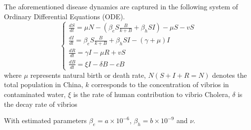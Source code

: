 \documentclass{book}
\begin{document}
The aforementioned disease dynamics are captured in the following system of Ordinary Differential Equations (ODE).
%
\begin{equation} \label{eq:cholera_model}
\left\{\begin{array}{l}
\frac{d S}{d t}=\mu N-\left(\beta_{e} S \frac{B}{k+B}+\beta_{h} S I\right)-\mu S-v S \\
\frac{d I}{d t}=\beta_{e} S \frac{B}{k+B}+\beta_{h} S I-(\gamma+\mu) I \\
\frac{d R}{d t}=\gamma I-\mu R+v S \\
\frac{d B}{d t}=\xi I-\delta B-c B
\end{array}\right.
\end{equation}
%
where $\mu$ represents natural birth or death rate, $N(S+I+R=N)$ denotes the total population in China, $k$ corresponds to the concentration of vibrios in contaminated water, $\xi$ is the rate of human contribution to vibrio Cholera, $\delta$ is the decay rate of vibrios 

With estimated parameters $\beta_e=a\times 10^{-6}$, $\beta_h=b\times 10^{-9}$ and $\nu$.
%
\end{document}
